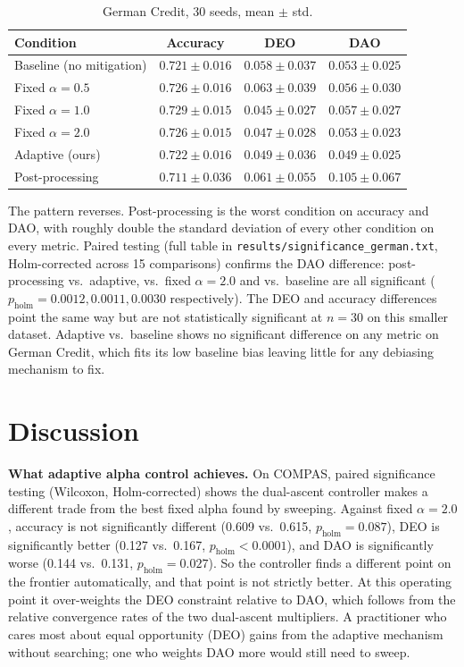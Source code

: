 \documentclass[11pt]{article}
\begin{document}
\begin{table}[h]
\centering
\begin{tabular}{lccc}
\toprule
Condition & Accuracy & DEO & DAO \\
\midrule
Baseline (no mitigation) & $0.721 \pm 0.016$ & $0.058 \pm 0.037$ & $0.053 \pm 0.025$ \\
Fixed $\alpha=0.5$       & $0.726 \pm 0.016$ & $0.063 \pm 0.039$ & $0.056 \pm 0.030$ \\
Fixed $\alpha=1.0$       & $0.729 \pm 0.015$ & $0.045 \pm 0.027$ & $0.057 \pm 0.027$ \\
Fixed $\alpha=2.0$       & $0.726 \pm 0.015$ & $0.047 \pm 0.028$ & $0.053 \pm 0.023$ \\
Adaptive (ours)          & $0.722 \pm 0.016$ & $0.049 \pm 0.036$ & $0.049 \pm 0.025$ \\
Post-processing          & $0.711 \pm 0.036$ & $0.061 \pm 0.055$ & $0.105 \pm 0.067$ \\
\bottomrule
\end{tabular}
\caption{German Credit, 30 seeds, mean $\pm$ std.}
\label{tab:german}
\end{table}

The pattern reverses. Post-processing is the worst condition on accuracy
and DAO, with roughly double the standard deviation of every other
condition on every metric. Paired testing (full table in
\nolinkurl{results/significance_german.txt}, Holm-corrected across 15
comparisons) confirms the DAO difference: post-processing vs.\ adaptive,
vs.\ fixed $\alpha=2.0$ and vs.\ baseline are all significant
($p_{\text{holm}} = 0.0012, 0.0011, 0.0030$ respectively). The DEO and
accuracy differences point the same way but are not statistically
significant at $n=30$ on this smaller dataset. Adaptive vs.\ baseline
shows no significant difference on any metric on German Credit, which
fits its low baseline bias leaving little for any debiasing mechanism to
fix.

\section{Discussion}
\label{sec:discussion}

\textbf{What adaptive alpha control achieves.} On COMPAS, paired
significance testing (Wilcoxon, Holm-corrected) shows the dual-ascent
controller makes a different trade from the best fixed alpha found by
sweeping. Against fixed $\alpha=2.0$, accuracy is not significantly
different (0.609 vs.\ 0.615, $p_{\text{holm}}=0.087$), DEO is
significantly better (0.127 vs.\ 0.167, $p_{\text{holm}}<0.0001$), and
DAO is significantly worse (0.144 vs.\ 0.131, $p_{\text{holm}}=0.027$).
So the controller finds a different point on the frontier automatically,
and that point is not strictly better. At this operating point it
over-weights the DEO constraint relative to DAO, which follows from the
relative convergence rates of the two dual-ascent multipliers. A
practitioner who cares most about equal opportunity (DEO) gains from the
adaptive mechanism without searching; one who weights DAO more would
still need to sweep.
\end{document}
